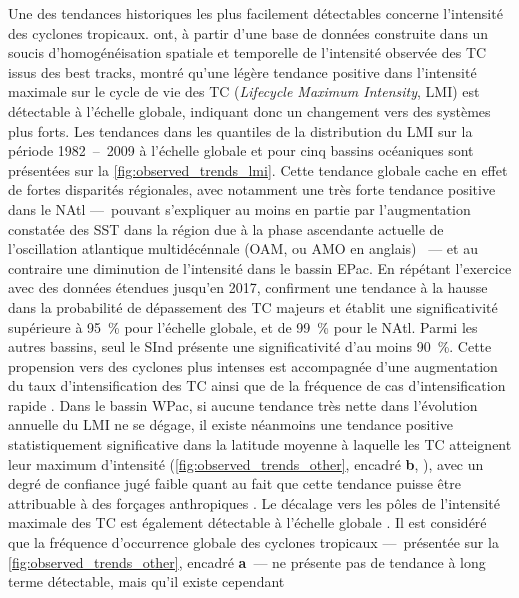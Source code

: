\documentclass[../main.tex]{subfiles}
\begin{document}
Une des tendances historiques les plus facilement détectables concerne l'intensité des cyclones tropicaux. \textcite{kossin_trend_2013} ont, à partir d'une base
de données construite dans un soucis d'homogénéisation spatiale et temporelle de l'intensité observée des TC issus des best tracks, montré qu'une légère
tendance positive dans l'intensité maximale sur le cycle de vie des TC (\textit{Lifecycle Maximum Intensity}, LMI) est détectable à l'échelle globale, indiquant
donc un changement vers des systèmes plus forts. Les tendances dans les quantiles de la distribution du LMI sur la période \num{1982}~--~\num{2009} à l'échelle
globale et pour cinq bassins océaniques sont présentées sur la \cref{fig:observed_trends_lmi}. Cette tendance globale cache en effet de fortes disparités
régionales, avec notamment une très forte tendance positive dans le NAtl ---~pouvant s'expliquer au moins en partie par l'augmentation constatée des SST dans la
région due à la phase ascendante actuelle de l'oscillation atlantique multidécénnale (OAM, ou AMO en anglais) \parencite{ting_forced_2009}~--- et au contraire
une diminution de l'intensité dans le bassin EPac. En répétant l'exercice avec des données étendues jusqu'en \num{2017}, \textcite{kossin_global_2020} confirment
une tendance à la hausse dans la probabilité de dépassement des TC majeurs et établit une significativité supérieure à \SI{95}{\percent} pour l'échelle globale,
et de \SI{99}{\percent} pour le NAtl. Parmi les autres bassins, seul le SInd présente une significativité d'au moins \SI{90}{\percent}. Cette propension vers
des cyclones plus intenses est accompagnée d'une augmentation du taux d'intensification des TC ainsi que de la fréquence de cas d'intensification rapide
\parencite{balaguru_increasing_2018,kishtawal_tropical_2012}. Dans le bassin WPac, si aucune tendance très nette dans l'évolution annuelle du LMI ne se dégage,
il existe néanmoins une tendance positive statistiquement significative dans la latitude moyenne à laquelle les TC atteignent leur maximum d'intensité
(\cref{fig:observed_trends_other}, encadré \textbf{b}, \hbox{\textcite{kossin_comment_2018}}), avec un degré de confiance jugé faible quant au  fait que cette
tendance puisse être attribuable à des forçages anthropiques \parencite{knutson_tropical_2019}. Le décalage vers les pôles de l'intensité maximale des TC est
également détectable à l'échelle globale \parencite{kossin_poleward_2014}. Il est considéré que la fréquence d'occurrence globale des cyclones tropicaux
---~présentée sur la \cref{fig:observed_trends_other}, encadré \textbf{a}~--- ne présente pas de tendance à long terme détectable, mais qu'il existe cependant
\end{document}
